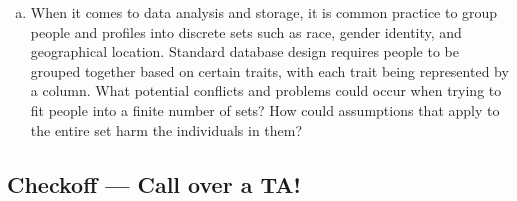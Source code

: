 \documentclass[12pt,letterpaper]{article}
\begin{document}
\begin{enumerate}[a.]
    
    \begin{mdframed} \vspace{4cm} \end{mdframed}
    
    \item When it comes to data analysis and storage, it is common practice to group people and profiles into discrete sets such as race, gender identity, and geographical location. Standard database design requires people to be grouped together based on certain traits, with each trait being represented by a column. What potential conflicts and problems could occur when trying to fit people into a finite number of sets? How could assumptions that apply to the entire set harm the individuals in them?
    
    \begin{mdframed} \vspace{4cm} \end{mdframed}
\end{enumerate}
\subsection*{Checkoff — Call over a TA!}
\end{document}
